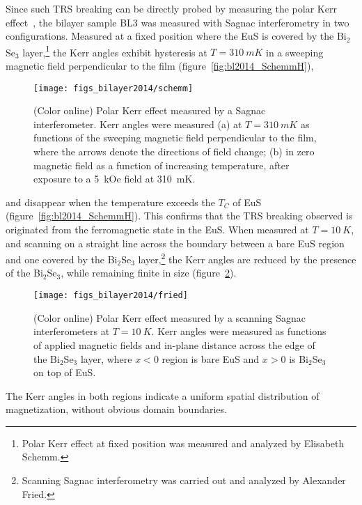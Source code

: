 Since such TRS breaking can be directly probed by measuring the polar Kerr effect~\cite{Xia2006}, the bilayer sample BL3 was measured with Sagnac interferometry in two configurations. Measured at a fixed position where the EuS is covered by the Bi$_2$Se$_3$ layer,\footnote{Polar Kerr effect at fixed position was measured and analyzed by Elisabeth Schemm.} the Kerr angles exhibit hysteresis at $T=\SI{310}{mK}$ in a sweeping magnetic field perpendicular to the film (figure~\ref{fig:bl2014_SchemmH}),%
%
\begin{figure}[ht]%
\centering%
\subfloat{\label{fig:bl2014_SchemmT}}%
\subfloat{\label{fig:bl2014_SchemmH}}%
\texttt{[image: figs\_bilayer2014/schemm]}
\caption[Polar Kerr effect in a Bi$_2$Se$_3$--EuS bilayer]{\label{fig:bl2014_schemm}(Color online) Polar Kerr effect measured by a Sagnac interferometer. Kerr angles were measured (a) at $T=\SI{310}{mK}$ as functions of the sweeping magnetic field perpendicular to the film, where the arrows denote the directions of field change; (b) in zero magnetic field as a function of increasing temperature, after exposure to a 5~kOe field at \SI{310}{mK}.}%
\end{figure} %
%
and disappear when the temperature exceeds the $T_C$ of EuS (figure~\ref{fig:bl2014_SchemmH}). This confirms that the TRS breaking observed is originated from the ferromagnetic state in the EuS. When measured at $T=\SI{10}{K}$, and scanning on a straight line across the boundary between a bare EuS region and one covered by the Bi$_2$Se$_3$ layer,\footnote{Scanning Sagnac interferometry was carried out and analyzed by Alexander Fried.} the Kerr angles are reduced by the presence of the Bi$_2$Se$_3$, while remaining finite in size (figure~\ref{fig:bl2014_Fried}).%
%
\begin{figure}[ht]%
\centering%
\texttt{[image: figs\_bilayer2014/fried]}
\caption[Spatial distribution of the Kerr angles in a Bi$_2$Se$_3$--EuS bilayer]{\label{fig:bl2014_Fried}(Color online) Polar Kerr effect measured by a scanning Sagnac interferometers at $T=\SI{10}{K}$. Kerr angles were measured as functions of applied magnetic fields and in-plane distance across the edge of the Bi$_2$Se$_3$ layer, where $x<0$ region is bare EuS and $x>0$ is Bi$_2$Se$_3$ on top of EuS.}%
\end{figure} %
The Kerr angles in both regions indicate a uniform spatial distribution of magnetization, without obvious domain boundaries.

\FloatBarrier%
